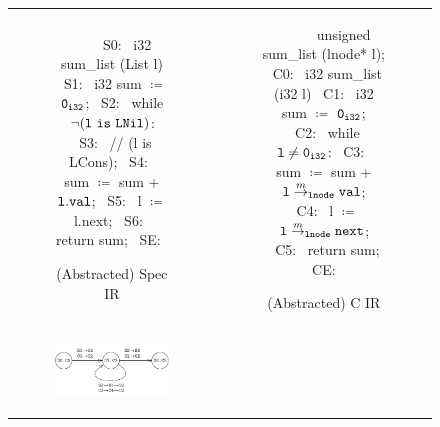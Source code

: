 \begin{figure}
\begin{tabular}{cc}
\begin{subfigure}[b]{0.45\textwidth}
\begin{center}
\begin{allLangEnvFoot}
~{\scriptsize \textcolor{mygray}{   }}~   
~{\scriptsize \textcolor{mygray}{S0:}}~ i32 sum_list (List l) {
~{\scriptsize \textcolor{mygray}{S1:}}~   i32 sum $\coloneqq$ ${\tt 0_{i32}}$;
~{\scriptsize \textcolor{mygray}{S2:}}~   while $\mathrm{\tt\neg (l\ is\ LNil)}$:
~{\scriptsize \textcolor{mygray}{S3:}}~     // (l is LCons);
~{\scriptsize \textcolor{mygray}{S4:}}~     sum $\coloneqq$ sum + ${\tt l.val}$;
~{\scriptsize \textcolor{mygray}{S5:}}~     l   $\coloneqq$ l.next;
~{\scriptsize \textcolor{mygray}{S6:}}~   return sum;
~{\scriptsize \textcolor{mygray}{SE:}}~ }
\end{allLangEnvFoot}
\end{center}
\caption{\label{fig:llTraverseSpec}(Abstracted) Spec IR}
\end{subfigure}%
&
\begin{subfigure}[b]{0.55\textwidth}
\begin{center}
\begin{allLangEnvFoot}
~{\scriptsize \textcolor{mygray}{\ \ \ }}~ unsigned sum_list (lnode* l);
~{\scriptsize \textcolor{mygray}{C0:}}~ i32 sum_list (i32 l) {
~{\scriptsize \textcolor{mygray}{C1:}}~   i32 sum $\coloneqq$ ${\tt 0_{i32}}$;
~{\scriptsize \textcolor{mygray}{C2:}}~   while ${\tt l \neq 0_{i32}}$:
~{\scriptsize \textcolor{mygray}{C3:}}~     sum $\coloneqq$ sum + ${\tt \tt l} \overset{m}{\rightarrow}_{\tt lnode} {\tt val}$;
~{\scriptsize \textcolor{mygray}{C4:}}~     l   $\coloneqq$ ${\tt \tt l} \overset{m}{\rightarrow}_{\tt lnode} {\tt next}$;
~{\scriptsize \textcolor{mygray}{C5:}}~   return sum;
~{\scriptsize \textcolor{mygray}{CE:}}~ }
\end{allLangEnvFoot}
\end{center}
\caption{\label{fig:llTraverseC}(Abstracted) C IR}
\end{subfigure}%
\\
\begin{subfigure}[b]{0.45\textwidth}
\begin{center}
{\includegraphics[scale=1.1]{chapters/figures/figSumListProductCfg.pdf}}

\end{center}
\end{subfigure}
\end{tabular}
\end{figure}
